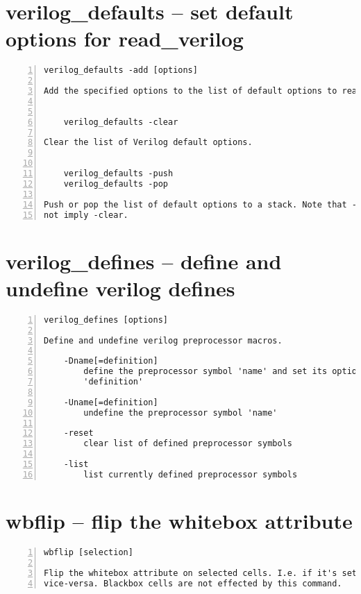\section{verilog\_defaults -- set default options for read\_verilog}
\label{cmd:verilog_defaults}
\begin{lstlisting}[numbers=left,frame=single]
    verilog_defaults -add [options]

Add the specified options to the list of default options to read_verilog.


    verilog_defaults -clear

Clear the list of Verilog default options.


    verilog_defaults -push
    verilog_defaults -pop

Push or pop the list of default options to a stack. Note that -push does
not imply -clear.
\end{lstlisting}

\section{verilog\_defines -- define and undefine verilog defines}
\label{cmd:verilog_defines}
\begin{lstlisting}[numbers=left,frame=single]
    verilog_defines [options]

Define and undefine verilog preprocessor macros.

    -Dname[=definition]
        define the preprocessor symbol 'name' and set its optional value
        'definition'

    -Uname[=definition]
        undefine the preprocessor symbol 'name'

    -reset
        clear list of defined preprocessor symbols

    -list
        list currently defined preprocessor symbols
\end{lstlisting}

\section{wbflip -- flip the whitebox attribute}
\label{cmd:wbflip}
\begin{lstlisting}[numbers=left,frame=single]
    wbflip [selection]

Flip the whitebox attribute on selected cells. I.e. if it's set, unset it, and
vice-versa. Blackbox cells are not effected by this command.
\end{lstlisting}


